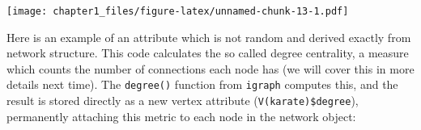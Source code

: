 \documentclass[
]{book}
\newenvironment{Shaded}{\begin{snugshade}}{\end{snugshade}}
\newcommand{\AttributeTok}[1]{\textcolor[rgb]{0.13,0.29,0.53}{#1}}
\newcommand{\CommentTok}[1]{\textcolor[rgb]{0.56,0.35,0.01}{\textit{#1}}}
\newcommand{\ConstantTok}[1]{\textcolor[rgb]{0.56,0.35,0.01}{#1}}
\newcommand{\DecValTok}[1]{\textcolor[rgb]{0.00,0.00,0.81}{#1}}
\newcommand{\DocumentationTok}[1]{\textcolor[rgb]{0.56,0.35,0.01}{\textbf{\textit{#1}}}}
\newcommand{\FunctionTok}[1]{\textcolor[rgb]{0.13,0.29,0.53}{\textbf{#1}}}
\newcommand{\NormalTok}[1]{#1}
\newcommand{\SpecialCharTok}[1]{\textcolor[rgb]{0.81,0.36,0.00}{\textbf{#1}}}
\newcommand{\StringTok}[1]{\textcolor[rgb]{0.31,0.60,0.02}{#1}}
\begin{document}
\begin{Shaded}
\end{Shaded}

\texttt{[image: chapter1\_files/figure-latex/unnamed-chunk-13-1.pdf]}

Here is an example of an attribute which is not random and derived exactly from network structure. This code calculates the so called degree centrality, a measure which counts the number of connections each node has (we will cover this in more details next time). The \texttt{degree()} function from \texttt{igraph} computes this, and the result is stored directly as a new vertex attribute (\texttt{V(karate)\$degree}), permanently attaching this metric to each node in the network object:
\end{document}

